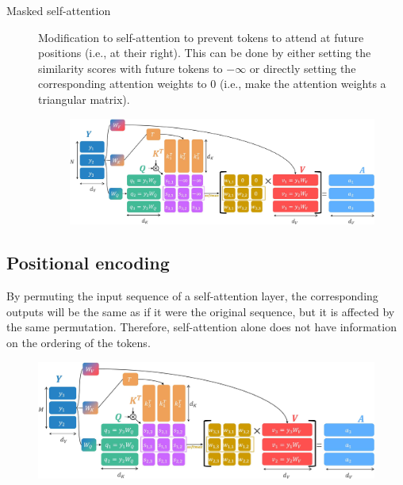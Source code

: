 \begin{description}
        \begin{description}
            \item[Masked self-attention] 
                Modification to self-attention to prevent tokens to attend at future positions (i.e., at their right). This can be done by either setting the similarity scores with future tokens to $-\infty$ or directly setting the corresponding attention weights to $0$ (i.e., make the attention weights a triangular matrix).

                \begin{figure}[H]
                    \centering
                    \includegraphics[width=0.8\linewidth]{./img/_masked_self_attention.jpg}
                \end{figure}
        \end{description}
\end{description}


\subsection{Positional encoding}

\begin{remark}
    By permuting the input sequence of a self-attention layer, the corresponding outputs will be the same as if it were the original sequence, but it is affected by the same permutation. Therefore, self-attention alone does not have information on the ordering of the tokens.

    \begin{figure}[H]
        \centering
        \includegraphics[width=0.8\linewidth]{./img/_self_attention_permutation.jpg}
    \end{figure}
\end{remark}


